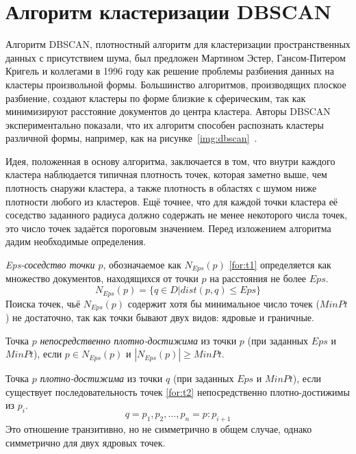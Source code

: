 \section{Алгоритм кластеризации DBSCAN}

Алгоритм DBSCAN, плотностный алгоритм для кластеризации пространственных данных с присутствием шума, был предложен Мартином Эстер, Гансом-Питером Кригель и коллегами в 1996 году как решение проблемы разбиения данных на кластеры произвольной формы.
Большинство алгоритмов, производящих плоское разбиение, создают кластеры по форме близкие к сферическим, так как минимизируют расстояние документов до центра кластера.
Авторы DBSCAN экспериментально показали, что их алгоритм способен распознать кластеры различной формы, например, как на \mbox{рисунке \ref{img:dbscan} \cite[197]{book}}.

Идея, положенная в основу алгоритма, заключается в том, что внутри каждого кластера наблюдается типичная плотность точек, которая заметно выше, чем плотность снаружи кластера, а также плотность в областях с шумом ниже плотности любого из кластеров.
Ещё точнее, что для каждой точки кластера её соседство заданного радиуса должно содержать не менее некоторого числа точек, это число точек задаётся пороговым значением. Перед изложением алгоритма дадим необходимые определения.

\textit{Eps-соседство точки $p$}, обозначаемое как $N_{Eps}(p)$ \ref{for:t1} определяется как множество документов, находящихся от точки $p$ на расстояния не более $Eps$.
\begin{equation}
\label{for:t1}
 N_{Eps}(p) = \{q \in D | dist(p, q) \leq Eps\}
\end{equation}
Поиска точек, чьё $N_{Eps}(p)$ содержит хотя бы минимальное число точек ($MinPt$) не достаточно, так как точки бывают двух видов: ядровые и граничные.

Точка $p$ \textit{непосредственно плотно-достижима} из точки $p$ (при заданных $Eps$ и $MinPt$), если
$p \in N_{Eps}(p)$ и $|N_{Eps}(p)| \geq MinPt$.

Точка $p$ \textit{плотно-достижима} из точки $q$ (при заданных $Eps$ и $MinPt$), если существует последовательность точек \ref{for:t2} непосредственно плотно-достижимы из $p_i$.
\begin{equation}
\label{for:t2}
	q = p_1, p_2, \ldots, p_n = p: p_{i+1}
\end{equation}
Это отношение транзитивно, но не симметрично в общем случае, однако симметрично для двух ядровых точек.

